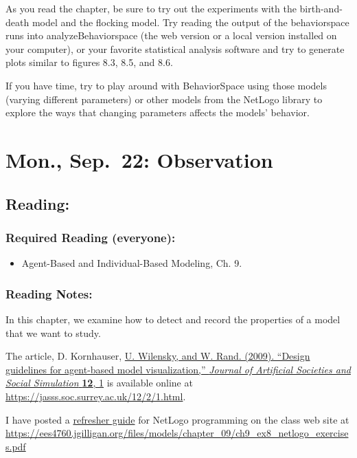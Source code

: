 \documentclass[
]{article}
\providecommand{\tightlist}{%
  \setlength{\itemsep}{0pt}\setlength{\parskip}{0pt}}
\begin{document}
As you read the chapter, be sure to try out the experiments with the
birth-and-death model and the flocking model. Try reading the output of
the behaviorspace runs into analyzeBehaviorspace (the web version or a
local version installed on your computer), or your favorite statistical
analysis software and try to generate plots similar to figures 8.3, 8.5,
and 8.6.

If you have time, try to play around with BehaviorSpace using those
models (varying different parameters) or other models from the NetLogo
library to explore the ways that changing parameters affects the models'
behavior.

\section{Mon., Sep.~22: Observation}\label{mon.-sep.-22-observation}

\subsection{Reading:}\label{reading-9}

\subsubsection{Required Reading
(everyone):}\label{required-reading-everyone-8}

\begin{itemize}
\tightlist
\item
  Agent-Based and Individual-Based Modeling, Ch. 9.
\end{itemize}

\subsubsection{Reading Notes:}\label{reading-notes-8}

In this chapter, we examine how to detect and record the properties of a
model that we want to study.

The article, D. Kornhauser,
\href{https://jasss.soc.surrey.ac.uk/12/2/1.html}{U. Wilensky, and W.
Rand. (2009). ``Design guidelines for agent-based model visualization,''
\emph{Journal of Artificial Societies and Social Simulation}
\textbf{12}, 1} is available online at
\url{https://jasss.soc.surrey.ac.uk/12/2/1.html}.

I have posted a
\href{/files/models/chapter_09/ch9_ex8_netlogo_exercises.pdf}{refresher
guide} for NetLogo programming on the class web site at
\url{https://ees4760.jgilligan.org/files/models/chapter_09/ch9_ex8_netlogo_exercises.pdf}
\end{document}
